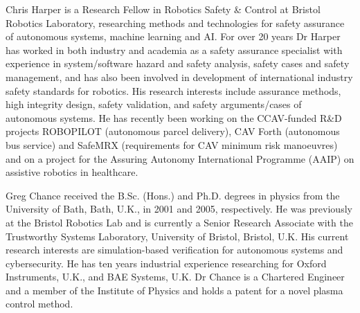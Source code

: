 \documentclass[letterpaper, 10 pt, journal, twoside]{IEEEtran}
\begin{document}


\printbibliography

\begin{IEEEbiography}{Chris Harper}
is a Research Fellow in Robotics Safety \& Control at Bristol Robotics Laboratory, researching methods and technologies for safety assurance of autonomous systems, machine learning and AI. For over 20 years Dr Harper has worked in both industry and academia as a safety assurance specialist with experience in system/software hazard and safety analysis, safety cases and safety management, and has also been involved in development of international industry safety standards for robotics. His research interests include assurance methods, high integrity design, safety validation, and safety arguments/cases of autonomous systems. He has recently been working on the CCAV-funded R\&D projects ROBOPILOT (autonomous parcel delivery), CAV Forth (autonomous bus service) and SafeMRX (requirements for CAV minimum risk manoeuvres) and on a project for the Assuring Autonomy International Programme (AAIP) on assistive robotics in healthcare. 
\end{IEEEbiography}

\begin{IEEEbiography}{Greg Chance}
received the B.Sc. (Hons.) and Ph.D. degrees in physics from the University of Bath, Bath, U.K., in 2001 and 2005, respectively. He was previously at the Bristol Robotics Lab and is currently a Senior Research Associate with the Trustworthy Systems Laboratory, University of Bristol, Bristol, U.K. His current research interests are simulation-based verification for autonomous systems and cybersecurity. He has ten years industrial experience researching for Oxford Instruments, U.K., and BAE Systems, U.K. Dr Chance is a Chartered Engineer and a member of the Institute of Physics and holds a patent for a novel plasma control method. 
\end{IEEEbiography}
\end{document}
